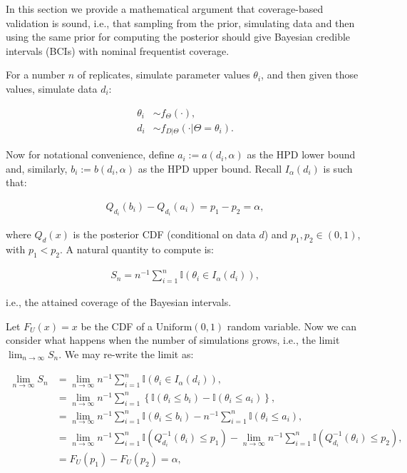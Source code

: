 \documentclass[oneside]{article}
\begin{document}
In this section we provide a mathematical argument that coverage-based validation is sound, i.e., that sampling from the prior, simulating data and then using the same prior for computing the posterior should give Bayesian credible intervals (BCIs) with nominal frequentist coverage.

For a number $n$ of replicates, simulate parameter
  values $\theta_i$, and then given those values, simulate data $d_i$:

\begin{align*}
\theta_i & \sim f_\Theta(\cdot), \\
d_i & \sim f_{D|\Theta}(\cdot | \Theta=\theta_i).
\end{align*}

Now for notational convenience, define $a_i := a(d_i, \alpha)$ as the HPD lower bound and, similarly, $b_i := b(d_i, \alpha)$ as the HPD upper bound.
Recall $I_{\alpha}\left(d_i\right)$ is such that:


\begin{align*}
Q_{d_i}\left(b_i\right) - Q_{d_i}\left(a_i\right) = p_1 - p_2 = \alpha,
\end{align*}

\noindent where $Q_{d}(x)$ is the posterior CDF (conditional on data $d$) and $p_1, p_2 \in (0,1)$, with $p_1 < p_2$.
A natural quantity to compute is:

\begin{align*}
S_n = n^{-1}\sum_{i=1}^n \mathbb{I}\left(\theta_i \in I_{\alpha}\left(d_i\right) \right),
\end{align*}

\noindent i.e., the attained coverage of the Bayesian intervals.

Let $F_U(x) = x$ be the CDF of a $\operatorname{Uniform(0, 1)}$ random variable. 
Now we can consider what happens when the number of simulations grows, i.e., the limit $\lim_{n \to \infty} S_n$.
We may re-write the limit as:

\begin{align*}
\lim_{n \to \infty} S_n &= \lim_{n \to \infty} n^{-1}\sum_{i=1}^n \mathbb{I}\left(\theta_i \in I_{\alpha}\left(d_i\right) \right),\\
&=  \lim_{n \to \infty} n^{-1}\sum_{i=1}^n \left\{ \mathbb{I}\left(\theta_i \leq b_i \right) - \mathbb{I}\left(\theta_i \leq a_i \right) \right\},\\
&=  \lim_{n \to \infty} n^{-1}\sum_{i=1}^n \mathbb{I}\left(\theta_i \leq b_i \right) -  n^{-1}\sum_{i=1}^n\mathbb{I}\left(\theta_i \leq a_i \right),\\
&=  \lim_{n \to \infty} n^{-1}\sum_{i=1}^n \mathbb{I}\left(Q_{d_i}^{-1}\left(\theta_i\right) \leq p_1 \right) -   \lim_{n \to \infty} n^{-1}\sum_{i=1}^n\mathbb{I}\left(Q_{d_i}^{-1}\left(\theta_i\right) \leq p_2 \right),\\
&= F_U(p_1) - F_U(p_2) = \alpha,
\end{align*}
\end{document}
